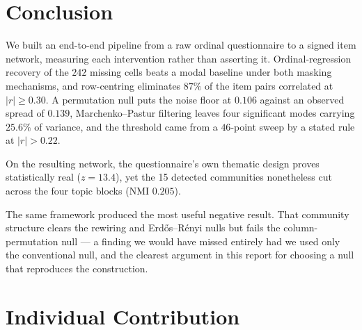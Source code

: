 \documentclass{article}
\begin{document}
\section{Conclusion}
\label{sec:conclusion}

We built an end-to-end pipeline from a raw ordinal questionnaire to a signed
item network, measuring each intervention rather than asserting it.
Ordinal-regression recovery of the $242$ missing cells beats a modal baseline
under both masking mechanisms, and row-centring eliminates $87\%$ of the item
pairs correlated at $|r|\geq0.30$. A permutation null puts the noise floor at
$0.106$ against an observed spread of $0.139$, Marchenko--Pastur filtering
leaves four significant modes carrying $25.6\%$ of variance, and the threshold
came from a $46$-point sweep by a stated rule at $|r|>0.22$.

On the resulting network, the questionnaire's own thematic design proves
statistically real ($z=13.4$), yet the 15 detected communities nonetheless cut
across the four topic blocks (NMI $0.205$).

The same framework produced the most useful negative result. That community
structure clears the rewiring and Erd\H{o}s--R\'enyi nulls but fails the
column-permutation null --- a finding we would have missed entirely had we used
only the conventional null, and the clearest argument in this report for
choosing a null that reproduces the construction.

\section{Individual Contribution}
\label{sec:contrib}
\end{document}
